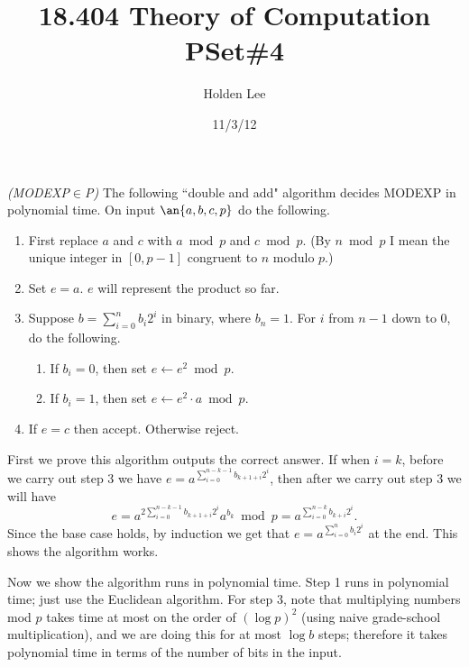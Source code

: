 \title{18.404 Theory of Computation PSet\#4}%
\author{Holden Lee}
\date{11/3/12}%
\maketitle
\begin{problem}{\it(MODEXP$\in$P)}
The following ``double and add" algorithm decides MODEXP in polynomial time. On input $\an{a,b,c,p}$ do the following.
\begin{enumerate}
\item
First replace $a$ and $c$ with $a\bmod p$ and $c\bmod p$. (By $n\bmod p$ I mean the unique integer in $[0,p-1]$ congruent to $n$ modulo $p$.)
\item Set $e=a$. $e$ will represent the product so far.
\item
Suppose $b=\sum_{i=0}^n b_i 2^i$ in binary, where $b_n=1$.  
For $i$ from $n-1$ down to $0$, do the following.
\begin{enumerate}
\item
If $b_i=0$, then set $e\leftarrow e^2\bmod p$.
\item 
If $b_i=1$, then set $e\leftarrow e^2\cdot a\bmod p$.
\end{enumerate}
\item
If $e=c$ then accept. Otherwise reject.
\end{enumerate}
First we prove this algorithm outputs the correct answer. If when $i=k$, before we carry out step 3 we have $e=a^{\sum_{i=0}^{n-k-1} b_{k+1+i}2^i}$, then after we carry out step 3 we will have 
\[e=a^{2\sum_{i=0}^{n-k-1} b_{k+1+i}2^i}a^{b_{k}}\bmod p
=a^{\sum_{i=0}^{n-k} b_{k+i}2^i}.\] 
Since the base case holds, by induction we get that $e=a^{\sum_{i=0}^{n} b_i2^i}$ at the end. This shows the algorithm works.

Now we show the algorithm runs in polynomial time.
Step 1 runs in polynomial time; just use the Euclidean algorithm. For step 3, note that multiplying numbers mod $p$ takes time at most on the order of $(\log p)^2$ (using naive grade-school multiplication), and we are doing this for at most $\log b$ steps; therefore it takes polynomial time in terms of the number of bits in the input.
\end{problem}

\pagebreak

